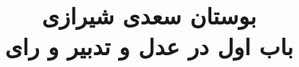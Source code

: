 \documentclass[14pt,b5paper]{article}
\begin{document}
\title{\Huge بوستان سعدی شیرازی \\
باب اول در عدل و تدبیر و رای}
\author{ }
\date{ }
\maketitle
\newpage
\tableofcontents
\newpage

\newpage

\newpage

\newpage

\newpage

\newpage

\newpage

\newpage

\newpage

\newpage

\newpage

\newpage

\newpage

\newpage

\newpage

\newpage

\newpage

\newpage

\newpage

\newpage

\newpage

\newpage

\newpage

\newpage

\newpage

\newpage

\newpage

\newpage

\newpage

\newpage

\newpage

\newpage

\newpage

\newpage

\newpage

\newpage

\newpage

\newpage

\newpage

\newpage

\newpage

\newpage
\end{document}
